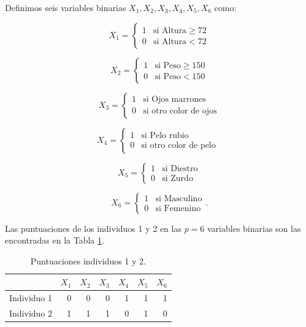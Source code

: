\documentclass[a4paper, 20pt]{article}
\begin{document}
Definimos seis variables binarias $X_1,X_2,X_3,X_4,X_5,X_6$ como:

$$X_1 = \left \{ \begin{matrix} 1 & \mbox{si Altura}  \geq 72 
\\ 0 & \mbox{si Altura}  < 72 \end{matrix}\right.$$

$$X_2 = \left \{ \begin{matrix} 1 & \mbox{si Peso}  \geq 150 
\\ 0 & \mbox{si Peso}  < 150 \end{matrix}\right.   $$

$$X_3 = \left \{ \begin{matrix} 1 & \mbox{si Ojos marrones} 
\\ 0 & \mbox{si otro color de ojos}\end{matrix}\right.   $$

$$X_4 = \left \{ \begin{matrix} 1 & \mbox{si Pelo rubio} 
\\ 0 & \mbox{si otro color de pelo } \end{matrix}\right.   $$

$$X_5 = \left \{ \begin{matrix} 1 & \mbox{si Diestro} 
\\ 0 & \mbox{si Zurdo } \end{matrix}\right.   $$

$$X_6 = \left \{ \begin{matrix} 1 & \mbox{si Masculino} 
\\ 0 & \mbox{si Femenino}  \end{matrix}\right.   .$$

Las puntuaciones de los individuos 1 y 2 en las $p=6$ variables binarias son las encontradas en la Tabla \ref{tab:puntuaciones}.

\begin{table}[h]
  \centering
  \caption{Puntuaciones individuos 1 y 2.}
  \label{tab:puntuaciones}
\resizebox{8cm}{!} {
  \begin{tabular}{lrrrrrr}
    \toprule
            & \multicolumn{1}{l}{$X_1$} & \multicolumn{1}{l}{$X_2$} & \multicolumn{1}{l}{$X_3$} & \multicolumn{1}{l}{$X_4$} & \multicolumn{1}{l}{$X_5$} & \multicolumn{1}{l}{$X_6$} \\ \midrule
Individuo 1 & 0                        & 0                        & 0                        & 1                        & 1                        & 1                        \\
Individuo 2 & 1                        & 1                        & 1                        & 0                        & 1                        & 0\\
\bottomrule
\end{tabular}
}
\end{table}
\end{document}
